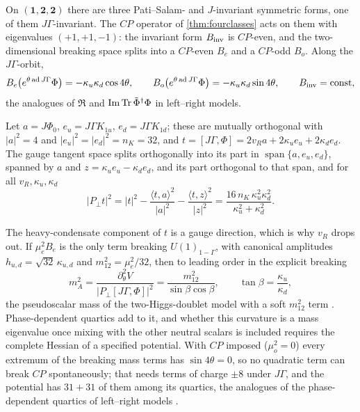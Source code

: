 \begin{proposition}
\label{prop:bidoublet}
On $(\mathbf1,\mathbf2,\mathbf2)$ there are three Pati--Salam- and $J$-invariant symmetric forms, one of them $J\Gamma$-invariant. The $CP$ operator of
\cref{thm:fourclasses} acts on them with eigenvalues $(+1,+1,-1)$: the invariant form $B_{\rm inv}$ is $CP$-even, and the two-dimensional breaking space splits into a
$CP$-even $B_e$ and a $CP$-odd $B_o$. Along the $J\Gamma$-orbit,
\[
B_e\bigl(e^{\theta\operatorname{ad} J\Gamma}\Phi\bigr)=-\kappa_u\kappa_d\cos4\theta,\qquad B_o\bigl(e^{\theta\operatorname{ad} J\Gamma}\Phi\bigr)=-\kappa_u\kappa_d\sin4\theta,\qquad B_{\rm inv}=\text{const},
\]
the analogues of $\Re$ and $\operatorname{Im}\operatorname{Tr}\tilde\Phi^\dagger\Phi$ in left--right models.
\end{proposition}

\begin{theorem}
\label{thm:mA}
Let $a=J\Phi_0$, $e_u=J\Gamma K_{1u}$, $e_d=J\Gamma K_{1d}$; these are mutually orthogonal with $|a|^2=4$ and $|e_u|^2=|e_d|^2=n_K=32$, and
$t=[J\Gamma,\Phi]=2v_Ra+2\kappa_ue_u+2\kappa_de_d$. The gauge tangent space splits orthogonally into its part in $\operatorname{span}\{a,e_u,e_d\}$, spanned by $a$ and
$z=\kappa_ue_u-\kappa_de_d$, and its part orthogonal to that span, and for all $v_R,\kappa_u,\kappa_d$
\[
\bigl|P_\perp t\bigr|^2=|t|^2-\frac{\langle t,a\rangle^2}{|a|^2}-\frac{\langle t,z\rangle^2}{|z|^2}=\frac{16\,n_K\,\kappa_u^2\kappa_d^2}{\kappa_u^2+\kappa_d^2}.
\]
\end{theorem}

The heavy-condensate component of $t$ is a gauge direction, which is why $v_R$ drops out. If $\mu_e^2B_e$ is the only term breaking $U(1)_{1-\Gamma}$, with canonical
amplitudes $h_{u,d}=\sqrt{32}\,\kappa_{u,d}$ and $m_{12}^2=\mu_e^2/32$, then to leading order in the explicit breaking
\[
m_A^2=\frac{\partial_\theta^2V}{|P_\perp[J\Gamma,\Phi]|^2}=\frac{m_{12}^2}{\sin\beta\cos\beta},\qquad \tan\beta=\frac{\kappa_u}{\kappa_d},
\]
the pseudoscalar mass of the two-Higgs-doublet model with a soft $m_{12}^2$ term \cite{Branco12}. Phase-dependent quartics add to it, and whether this curvature
is a mass eigenvalue once mixing with the other neutral scalars is included requires the complete Hessian of a specified potential. With $CP$ imposed
($\mu_o^2=0$) every extremum of the breaking mass terms has $\sin4\theta=0$, so no quadratic term can break $CP$ spontaneously; that needs terms of charge $\pm8$
under $J\Gamma$, and the potential has $31+31$ of them among its quartics, the analogues of the phase-dependent quartics of left--right models \cite{DGKO91}.

